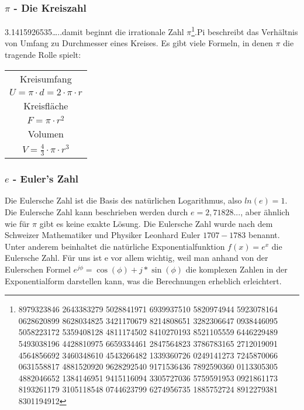 \documentclass[letterpaper, titlepage]{article}
\begin{document}
\subsubsection{$\pi$ - Die Kreiszahl}\label{Die Kreiszahl}
3.1415926535\dots ..damit beginnt die irrationale Zahl $\pi$\footnote{8979323846 2643383279 5028841971 6939937510 5820974944 5923078164 0628620899 8628034825 3421170679 8214808651 3282306647 0938446095 5058223172 5359408128 4811174502 8410270193 8521105559 6446229489 5493038196 4428810975 6659334461 2847564823 3786783165 2712019091 4564856692 3460348610 4543266482 1339360726 0249141273 7245870066 0631558817 4881520920 9628292540 9171536436 7892590360 0113305305 4882046652 1384146951 9415116094 3305727036 5759591953 0921861173 8193261179 3105118548 0744623799 6274956735 1885752724 8912279381 8301194912}.Pi beschreibt das Verhältnis von Umfang zu Durchmesser eines Kreises. Es gibt viele Formeln, in denen $\pi$ die tragende Rolle spielt:


\begin{center}
\renewcommand{\arraystretch}{1.5} %
\begin{tabular}{|c|}
\hline
Kreisumfang \\
\(U = \pi \cdot d = 2 \cdot \pi \cdot r\) \\
\hline
Kreisfläche \\
\(F = \pi \cdot r^2\) \\
\hline
Volumen \\
\(V = \frac{4}{3} \cdot \pi \cdot r^3\) \\
\hline
\end{tabular}
\renewcommand{\arraystretch}{1.0} %
\end{center}
\hfill

\subsubsection{$e$ - Euler's Zahl}\label{Euler's Zahl}
Die Eulersche Zahl ist die Basis des natürlichen Logarithmus, also $ln(e) = 1$. Die Eulersche Zahl kann beschrieben werden durch $e = 2,71828$..., aber ähnlich wie für $\pi$ gibt es keine exakte Lösung. Die Eulersche Zahl wurde nach dem Schweizer Mathematiker und Physiker Leonhard Euler \(1707-1783\) benannt. Unter anderem beinhaltet die natürliche Exponentialfunktion $f(x) = e^x$ die Eulersche Zahl. Für uns ist e vor allem wichtig, weil man anhand von der Eulerschen Formel $e^{j\phi}=\cos(\phi)+j*\sin(\phi)$ die komplexen Zahlen in der Exponentialform darstellen kann, was die Berechnungen erheblich erleichtert.
\end{document}
